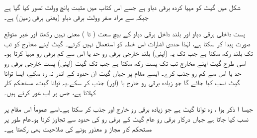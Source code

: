  شکل  میں  گیٹ کو مہیا کردہ برقی دباو ہے جسے اس کتاب میں مثبت پانچ وولٹ  تصور کیا گیا ہے جبکہ سے مراد صفر وولٹ برقی دباو (یعنی برقی زمین) ہے۔
 
 
پست داخلی برقی دباو اور بلند داخل برقی دباو کے بیچ سعت ( تا ) معنی نہیں رکھتا اور غیر متوقع صورت پیدا کر سکتا ہے، لہٰذا عددی اشارات اس خطہ کو استعمال نہیں کرتے۔ 
 گیٹ اپنے مخارج کو تب تک بلند رکھ سکتا ہے جب تک یہ (اپنی) بلند خارجی برقی رو حد یا اس سے کم برقی رو مہیا کرتا ہو۔اسی طرح گیٹ اپنے مخارج تب تک پست رکھ سکتا ہے جب تک گیٹ (اپنی) پست خارجی برقی رو حد یا اس سے کم رو جذب کرے۔ ایسے مقام پر جہاں گیٹ ان حدود کے اندر نہ رہ سکے، ایسا توانا گیٹ نسب کیا جائے گا جو زیادہ برقی رو خارج یا (اور) جذب کر سکے۔یہ توانا گیٹ، مستحکم کار کہلاتا ہے، جس پر اب غور کرتے ہیں۔
 	
جیسا ا ذکر ہوا ،    وہ توانا گیٹ ہے جو زیادہ برقی رو خارج اور جذب کر سکتا ہے۔اسے عموماً اس مقام پر نسب کیا جاتا ہے جہاں درکار برقی رو عام گیٹ کے برقی رو کی حدود سے تجاوز کرتا ہو۔عام طور پر  مستحکم کار مجاز و معذور ہونے کی صلاحیت بھی رکھتا ہے۔ 

